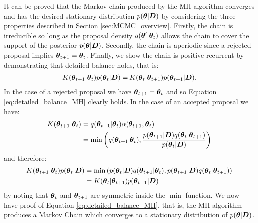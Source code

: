 It can be proved that the Markov chain produced by the \gls{MH} algorithm converges and has the desired stationary
distribution \(p(\boldsymbol{\theta} | \boldsymbol{D})\) by considering the three properties described in Section \ref{sec:MCMC_overview}.
Firstly, the chain is irreducible so long as the proposal density \(q(\boldsymbol{\theta}' | \boldsymbol{\theta}_t)\) allows the chain to
cover the support of the posterior \(p(\boldsymbol{\theta} | \boldsymbol{D})\). Secondly, the chain is aperiodic since a rejected proposal
implies \(\boldsymbol{\theta}_{t+1} = \boldsymbol{\theta}_t\). Finally, we show the chain is positive recurrent by demonstrating that
detailed balance holds, that is:
\begin{align} 
\label{eq:detailed_balance_MH}
K(\boldsymbol{\theta}_{t+1} | \boldsymbol{\theta}_t) p(\boldsymbol{\theta}_t | \boldsymbol{D}) = K(\boldsymbol{\theta}_t | \boldsymbol{\theta}_{t+1}) p(\boldsymbol{\theta}_{t+1} | \boldsymbol{D}).
\end{align}
In the case of a rejected proposal we have \(\boldsymbol{\theta}_{t+1} = \boldsymbol{\theta}_t\) and so Equation \eqref{eq:detailed_balance_MH}
clearly holds. In the case of an accepted proposal we have:
\begin{align} 
K(\boldsymbol{\theta}_{t+1} | \boldsymbol{\theta}_t) &= q(\boldsymbol{\theta}_{t+1} | \boldsymbol{\theta}_t) \alpha(\boldsymbol{\theta}_{t+1}, \boldsymbol{\theta}_t) \notag \\
&= \min\left(q(\boldsymbol{\theta}_{t+1} | \boldsymbol{\theta}_t), 
\frac{p(\boldsymbol{\theta}_{t+1} | \boldsymbol{D}) q(\boldsymbol{\theta}_t | \boldsymbol{\theta}_{t+1})}{p(\boldsymbol{\theta}_t | \boldsymbol{D})}\right)
\end{align}
and therefore:
\begin{align} 
K(\boldsymbol{\theta}_{t+1} | \boldsymbol{\theta}_t) p(\boldsymbol{\theta}_t | \boldsymbol{D}) 
&= \min\left(p(\boldsymbol{\theta}_t | \boldsymbol{D}) q(\boldsymbol{\theta}_{t+1} | \boldsymbol{\theta}_t), 
p(\boldsymbol{\theta}_{t+1} | \boldsymbol{D}) q(\boldsymbol{\theta}_t | \boldsymbol{\theta}_{t+1})\right) \notag \\
&= K(\boldsymbol{\theta}_t | \boldsymbol{\theta}_{t+1}) p(\boldsymbol{\theta}_{t+1} | \boldsymbol{D})
\end{align} 
by noting that \(\boldsymbol{\theta}_t\) and \(\boldsymbol{\theta}_{t+1}\) are symmetric inside the \(\min\) function. We now have proof of
Equation \eqref{eq:detailed_balance_MH}, that is, the \gls{MH} algorithm produces a Markov Chain which converges to
a stationary distribution of \(p(\boldsymbol{\theta} | \boldsymbol{D})\).


